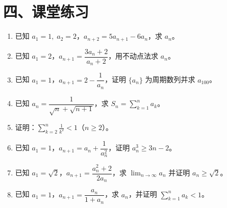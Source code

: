 \documentclass[12pt, a4paper]{ctexart}
\begin{document}
\section*{\textcolor{tipgreen}{四、课堂练习}}

\begin{enumerate}
\item 已知 $a_1 = 1,\;a_2 = 2$，$a_{n+2} = 5a_{n+1} - 6a_n$，求 $a_n$。

\item 已知 $a_1 = 2$，$a_{n+1} = \dfrac{3a_n + 2}{a_n + 2}$，用不动点法求 $a_n$。

\item 已知 $a_1 = 1$，$a_{n+1} = 2 - \dfrac{1}{a_n}$，证明 $\{a_n\}$ 为周期数列并求 $a_{100}$。

\item 已知 $a_n = \dfrac{1}{\sqrt{n} + \sqrt{n+1}}$，求 $S_n = \displaystyle\sum_{k=1}^{n}a_k$。

\item 证明：$\displaystyle\sum_{k=2}^{n}\frac{1}{k^2} < 1$（$n\geq 2$）。

\item 已知 $a_1 = 1$，$a_{n+1} = a_n + \dfrac{1}{a_n^2}$，证明 $a_n^3 \geq 3n - 2$。

\item 已知 $a_1 = \sqrt{2}$，$a_{n+1} = \dfrac{a_n^2 + 2}{2a_n}$，求 $\displaystyle\lim_{n\to\infty}a_n$ 并证明 $a_n \geq \sqrt{2}$。

\item 已知 $a_1 = 1$，$a_{n+1} = \dfrac{a_n}{1+a_n}$，求 $a_n$，并证明 $\displaystyle\sum_{k=1}^{n}a_k < 1$。
\end{enumerate}

\vspace{12pt}
\end{document}
